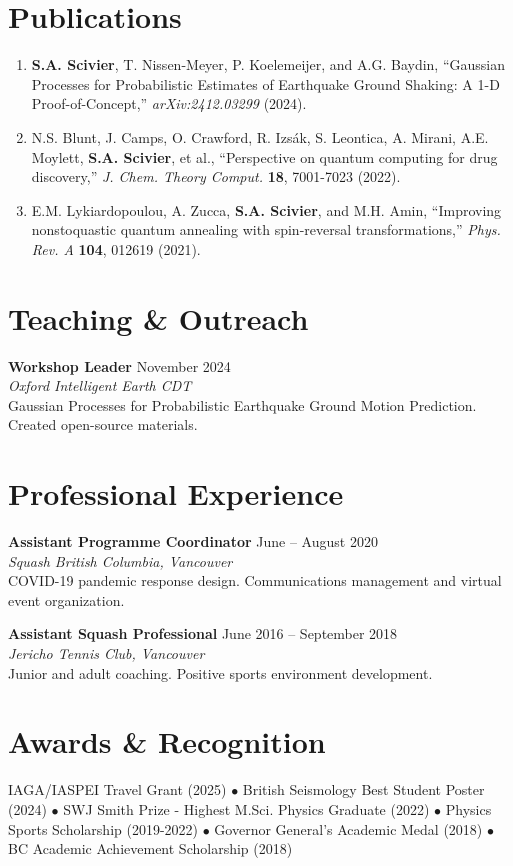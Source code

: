 \documentclass[11pt,a4paper]{article}
\newcommand{\cventry}[4]{%
    \noindent\textbf{#1} \hfill #2\\
    \textit{#3} \hfill #4\\[0.3em]
}
\begin{document}
\section*{Publications}
\begin{enumerate}
\item \textbf{S.A. Scivier}, T. Nissen-Meyer, P. Koelemeijer, and A.G. Baydin, ``Gaussian Processes for Probabilistic Estimates of Earthquake Ground Shaking: A 1-D Proof-of-Concept,'' \textit{arXiv:2412.03299} (2024).

\item N.S. Blunt, J. Camps, O. Crawford, R. Izsák, S. Leontica, A. Mirani, A.E. Moylett, \textbf{S.A. Scivier}, et al., ``Perspective on quantum computing for drug discovery,'' \textit{J. Chem. Theory Comput.} \textbf{18}, 7001-7023 (2022).

\item E.M. Lykiardopoulou, A. Zucca, \textbf{S.A. Scivier}, and M.H. Amin, ``Improving nonstoquastic quantum annealing with spin-reversal transformations,'' \textit{Phys. Rev. A} \textbf{104}, 012619 (2021).
\end{enumerate}

\section*{Teaching \& Outreach}
\cventry{Workshop Leader}{November 2024}{Oxford Intelligent Earth CDT}{}
Gaussian Processes for Probabilistic Earthquake Ground Motion Prediction. Created open-source materials.

\section*{Professional Experience}
\cventry{Assistant Programme Coordinator}{June -- August 2020}{Squash British Columbia, Vancouver}{}
COVID-19 pandemic response design. Communications management and virtual event organization.

\cventry{Assistant Squash Professional}{June 2016 -- September 2018}{Jericho Tennis Club, Vancouver}{}
Junior and adult coaching. Positive sports environment development.

\section*{Awards \& Recognition}
IAGA/IASPEI Travel Grant (2025) $\bullet$ British Seismology Best Student Poster (2024) $\bullet$ SWJ Smith Prize - Highest M.Sci. Physics Graduate (2022) $\bullet$ Physics Sports Scholarship (2019-2022) $\bullet$ Governor General's Academic Medal (2018) $\bullet$ BC Academic Achievement Scholarship (2018)
\end{document}
